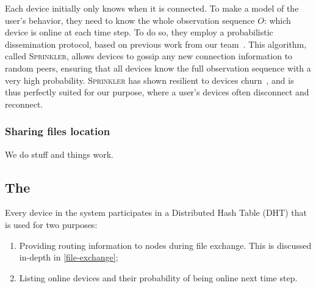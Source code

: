 Each device initially only knows when it is connected. 
To make a model of the user's behavior, they need to know the whole observation sequence $O$: which device is online at each time step.
To do so, they employ a probabilistic dissemination protocol, based on previous work from our team~\cite{luxey:hal-01704172}.
This algorithm, called \textsc{Sprinkler}, allows devices to gossip any new connection information to random peers, ensuring that all devices know the full observation sequence with a very high probability.
\textsc{Sprinkler} has shown resilient to devices churn~\cite{luxey:cascade}, and is thus perfectly suited for our purpose, where a user's devices often disconnect and reconnect. 




\subsubsection{Sharing files location}%
\label{ssub:sharing_files_location}

We do stuff and things work.


\subsection{The \globaloverlay}%
\label{global-overlay}


Every device in the system participates in a Distributed Hash Table (DHT) that is used for two purposes:
\begin{enumerate}
  \item Providing routing information to nodes during file exchange. This is 
    discussed in-depth in \cref{file-exchange};
	\item Listing online devices and their probability of being online next time step.
\end{enumerate}

